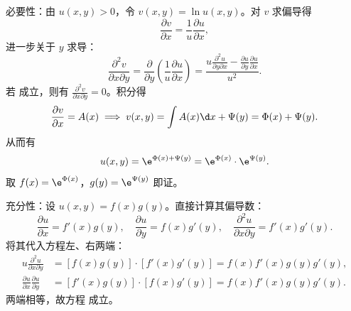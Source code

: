 \begin{myproof}

    必要性：由 $u(x, y) > 0$，令 $v(x, y) = \ln u(x, y)$。对 $v$ 求偏导得
    \begin{equation}
        \frac{\partial v}{\partial x} = \frac{1}{u} \frac{\partial u}{\partial x},
        \label{eq:vx-pde}
    \end{equation}
    进一步关于 $y$ 求导：
    \begin{equation}
        \frac{\partial^2 v}{\partial x \partial y} = \frac{\partial}{\partial y} \left( \frac{1}{u} \frac{\partial u}{\partial x} \right) = \frac{u \frac{\partial^2 u}{\partial y \partial x} - \frac{\partial u}{\partial y} \frac{\partial u}{\partial x}}{u^2}.
        \label{eq:vxy-pde}
    \end{equation}
    若  成立，则有 $\frac{\partial^2 v}{\partial x \partial y} = 0$。积分得
    \begin{equation}
        \frac{\partial v}{\partial x} = A(x) \implies v(x, y) = \int A(x) \d x + \Psi(y) = \Phi(x) + \Psi(y).
        \label{eq:v-integral}
    \end{equation}
    从而有
    \begin{equation}
        u(x, y) = \e^{\Phi(x) + \Psi(y)} = \e^{\Phi(x)} \cdot \e^{\Psi(y)}.
        \label{eq:u-sep-form}
    \end{equation}
    取 $f(x) = \e^{\Phi(x)}$，$g(y) = \e^{\Psi(y)}$ 即证。

    充分性：设 $u(x, y) = f(x)g(y)$。直接计算其偏导数：
    \begin{equation}
        \frac{\partial u}{\partial x} = f'(x)g(y), \quad \frac{\partial u}{\partial y} = f(x)g'(y), \quad \frac{\partial^2 u}{\partial x \partial y} = f'(x)g'(y).
        \label{eq:suff-deriv}
    \end{equation}
    将其代入方程左、右两端：
    \begin{equation}
        \begin{aligned}
            u \frac{\partial^2 u}{\partial x \partial y}                & = [f(x)g(y)] \cdot [f'(x)g'(y)] = f(x)f'(x)g(y)g'(y), \\
            \frac{\partial u}{\partial x} \frac{\partial u}{\partial y} & = [f'(x)g(y)] \cdot [f(x)g'(y)] = f(x)f'(x)g(y)g'(y).
        \end{aligned}
        \label{eq:suff-verify}
    \end{equation}
    两端相等，故方程  成立。
\end{myproof}


